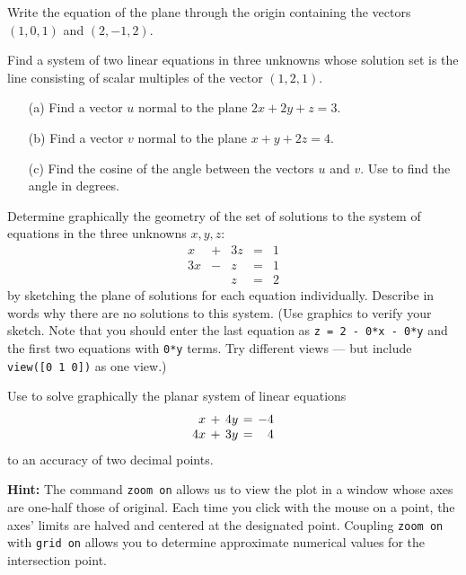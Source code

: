 \documentclass{ximera}
\begin{document}
\begin{exercise} \label{c2.2.7}
Write the equation of the plane through the origin containing the
vectors $(1,0,1)$ and $(2,-1,2)$.
\end{exercise}

\begin{exercise} \label{c2.2.8}
Find a system of two linear equations in three
unknowns whose solution set is the line consisting of scalar
multiples of the vector $(1,2,1)$.
\end{exercise}

\begin{exercise} \label{c2.2.9}
\begin{itemize}
\item[(a)] Find a vector $u$ normal to the plane $2x+2y+z=3$.
\item[(b)] Find a vector $v$ normal to the plane $x+y+2z=4$.
\item[(c)] Find the cosine of the angle between the vectors $u$ and $v$.
Use \Matlab to find the angle in degrees.
\end{itemize}
\end{exercise}

\begin{exercise} \label{c2.2.10}
Determine graphically the geometry of the set of solutions to the
system of equations in the three unknowns $x,y,z$:
\[
\begin{array}{rcrcr}
  x & + & 3z  & = & 1\\
 3x & - &  z  & = & 1\\
    &   &  z  & = & 2
\end{array}
\]
by sketching the plane of solutions for each equation individually.
Describe in words why there are no solutions to this system.
(Use \Matlab graphics to verify your sketch.  Note that you should
enter the last equation as {\tt z = 2 - 0*x - 0*y} and the first two
equations with {\tt 0*y} terms.  Try different views --- but include
{\tt view([0 1 0])} as one view.)
\end{exercise}

\CEXER

\begin{exercise} \label{c2.2.1}
Use \Matlab to solve graphically the planar system of linear
equations
\[
\arraycolsep 2pt
\begin{array}{rcrcr}
 x & + & 4y & = & -4 \\
4x & + & 3y & = &  4
\end{array}
\]
to an accuracy of two decimal points.

{\bf Hint:} The \Matlab command {\tt zoom on}
allows us to
view the plot in a window whose axes are one-half those of
original.  Each time you click with the mouse on a point,
the axes' limits are halved and centered at the designated
point. Coupling {\tt zoom on} with {\tt grid on} allows you
to determine approximate numerical values for the intersection
point.
\end{exercise}
\end{document}
